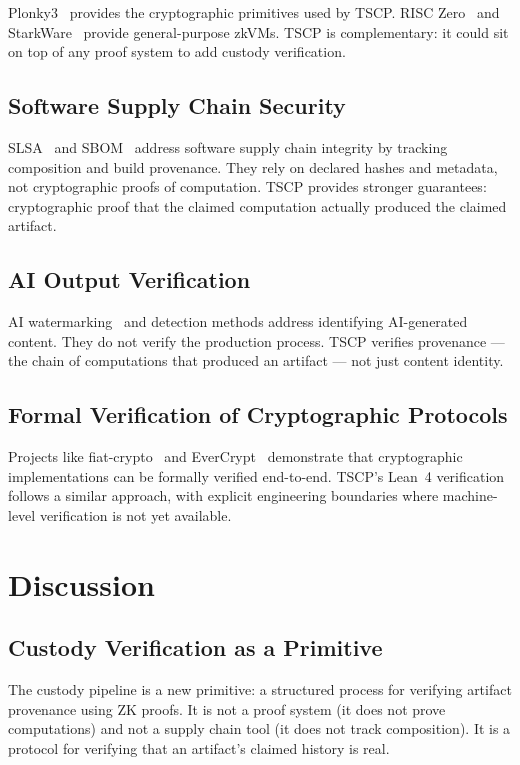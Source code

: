 \documentclass[11pt,a4paper]{article}
\begin{document}
Plonky3~\cite{plonky3} provides the cryptographic primitives used by TSCP. RISC Zero~\cite{risczero} and StarkWare~\cite{starkware} provide general-purpose zkVMs. TSCP is complementary: it could sit on top of any proof system to add custody verification.

\subsection{Software Supply Chain Security}

SLSA~\cite{slsa} and SBOM~\cite{sbom} address software supply chain integrity by tracking composition and build provenance. They rely on declared hashes and metadata, not cryptographic proofs of computation. TSCP provides stronger guarantees: cryptographic proof that the claimed computation actually produced the claimed artifact.

\subsection{AI Output Verification}

AI watermarking~\cite{watermarking} and detection methods address identifying AI-generated content. They do not verify the production process. TSCP verifies provenance --- the chain of computations that produced an artifact --- not just content identity.

\subsection{Formal Verification of Cryptographic Protocols}

Projects like fiat-crypto~\cite{fiatcrypto} and EverCrypt~\cite{evercrypt} demonstrate that cryptographic implementations can be formally verified end-to-end. TSCP's Lean~4 verification follows a similar approach, with explicit engineering boundaries where machine-level verification is not yet available.

\section{Discussion}

\subsection{Custody Verification as a Primitive}

The custody pipeline is a new primitive: a structured process for verifying artifact provenance using ZK proofs. It is not a proof system (it does not prove computations) and not a supply chain tool (it does not track composition). It is a protocol for verifying that an artifact's claimed history is real.
\end{document}
